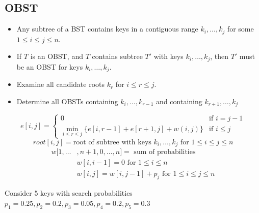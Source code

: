 \documentclass{article}
\begin{document}
\begin{multicols*}{2}
    \subsection*{OBST}
    \begin{itemize}
        \item Any subtree of a BST contains keys in a contiguous range \(k_i,
              \ldots, k_j\) for some \(1 \leq i \leq j \leq n\).
        \item If \(T\) is an OBST, and \(T\) contains subtree \(T'\) with keys
              \(k_i, \ldots, k_j\), then \(T'\) must be an OBST for keys \(k_i,
              \ldots, k_j\).
        \item Examine all candidate roots \(k_r\) for \(i \leq r \leq j\).
        \item Determine all OBSTs containing \(k_i, \ldots, k_{r-1}\) and
              containing \(k_{r+1}, \ldots, k_j\)
    \end{itemize}
    \begin{equation*}
        e[i, j] = \begin{cases}
            0                                                          & \text{if } i = j - 1 \\
            \min_{i \leq r \leq j} \{e[i, r-1] + e[r+1, j] + w(i, j)\} & \text{if } i \leq j
        \end{cases}
    \end{equation*}
    \begin{equation*}
        root[i, j] = \text{root of subtree with keys } k_i, \ldots, k_j \text{ for } 1 \leq i \leq j \leq n
    \end{equation*}
    \begin{align*}
        w[1, \ldots & , n+1, 0, \ldots, n]  = \text{ sum of probabilities}          \\
                    & w[i, i-1] = 0 \text{ for } 1 \leq i \leq n                    \\
                    & w[i, j] = w[i, j-1] + p_j \text{ for } 1 \leq i \leq j \leq n
    \end{align*}

    Consider 5 keys with search probabilities \(p_1 = 0.25, p_2 = 0.2, p_3 =
    0.05, p_4 = 0.2, p_5 = 0.3\)


\end{multicols*}
\end{document}
